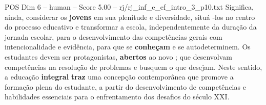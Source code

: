 \begin{textsample}{POS Dim 6 – human – Score 5.00 – rj/rj\_inf\_e\_ef\_intro\_3\_p10.txt}  \label{ex:f6_pos_001}
Significa, ainda, considerar os \textbf{jovens} em sua plenitude e diversidade, situá -los no centro do processo educativo e transformar a escola, independentemente da duração da jornada escolar, para o desenvolvimento das competências gerais com intencionalidade e evidência, para que se \textbf{conheçam} e se autodeterminem.
Os estudantes devem ser protagonistas, \textbf{abertos} ao novo ; que desenvolvam competências na resolução de problemas e busquem o que desejam.
Neste sentido, a educação \textbf{integral} \textbf{traz} uma concepção contemporânea que promove a formação plena do estudante, a partir do desenvolvimento de competências e habilidades essenciais para o enfrentamento dos desafios do século XXI.

\end{textsample}
